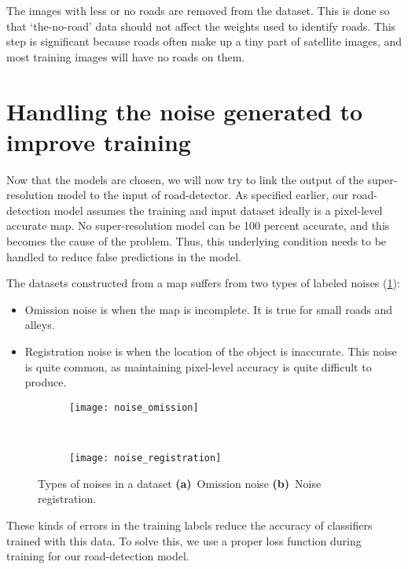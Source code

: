 The images with less or no roads are removed from the dataset. This is done so that `the-no-road' data should not affect the weights used to identify roads. This step is significant because roads often make up a tiny part of satellite images, and most training images will have no roads on them.


\section{Handling the noise generated to improve training}
Now that the models are chosen, we will now try to link the output of the super-resolution model to the input of road-detector. As specified earlier, our road-detection model assumes the training and input dataset ideally is a pixel-level accurate map. No super-resolution model can be 100 percent accurate, and this becomes the cause of the problem. Thus, this underlying condition needs to be handled to reduce false predictions in the model.

The datasets constructed from a map suffers from two types of labeled noises (\cref{fig:noise_types}):
\begin{itemize}
  \setlength\itemsep{1mm}
  \item Omission noise is when the map is incomplete. It is true for small roads and alleys.
  \item Registration noise is when the location of the object is inaccurate. This noise is quite common, as maintaining pixel-level accuracy is quite difficult to produce.
\end{itemize}

\begin{figure}[h!]
  \centering
  \begin{subfigure}{0.63\textwidth}
    \texttt{[image: noise\_omission]}
    \caption{}
  \end{subfigure}~
  \begin{subfigure}{0.35\textwidth}
    \texttt{[image: noise\_registration]}
    \caption{}
  \end{subfigure}
  \caption[Types of noises in a dataset]{Types of noises in a dataset \textbf{(a)}~Omission noise \textbf{(b)}~Noise registration.}
  \label{fig:noise_types}
\end{figure}

These kinds of errors in the training labels reduce the accuracy of classifiers trained with this data. To solve this, we use a proper loss function during training for our road-detection model.
